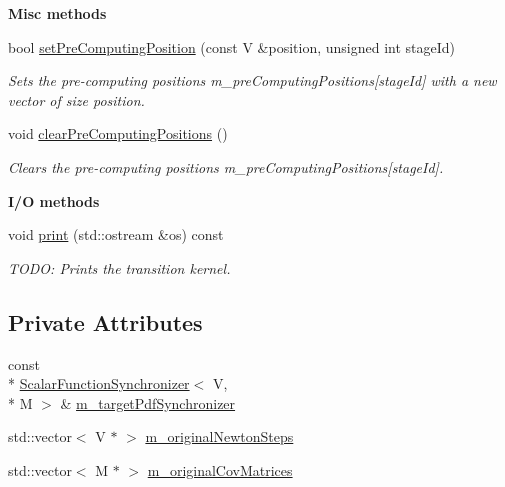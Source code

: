 \begin{Indent}{\bf Misc methods}\par
\begin{DoxyCompactItemize}
\item 
bool \hyperlink{class_q_u_e_s_o_1_1_hessian_cov_matrices_t_k_group_a935cca86e22544d5a478e05862a4a200}{set\-Pre\-Computing\-Position} (const V \&position, unsigned int stage\-Id)
\begin{DoxyCompactList}\small\item\em Sets the pre-\/computing positions {\ttfamily m\-\_\-pre\-Computing\-Positions}\mbox{[}stage\-Id\mbox{]} with a new vector of size {\ttfamily position}. \end{DoxyCompactList}\item 
void \hyperlink{class_q_u_e_s_o_1_1_hessian_cov_matrices_t_k_group_af5ca7d6d8464e444607bb3da6cd39be8}{clear\-Pre\-Computing\-Positions} ()
\begin{DoxyCompactList}\small\item\em Clears the pre-\/computing positions {\ttfamily m\-\_\-pre\-Computing\-Positions}\mbox{[}stage\-Id\mbox{]}. \end{DoxyCompactList}\end{DoxyCompactItemize}
\end{Indent}
\begin{Indent}{\bf I/\-O methods}\par
\begin{DoxyCompactItemize}
\item 
void \hyperlink{class_q_u_e_s_o_1_1_hessian_cov_matrices_t_k_group_aa780d91ffdf133df50d5d9a3a0edaa95}{print} (std\-::ostream \&os) const 
\begin{DoxyCompactList}\small\item\em T\-O\-D\-O\-: Prints the transition kernel. \end{DoxyCompactList}\end{DoxyCompactItemize}
\end{Indent}
\subsection*{Private Attributes}
\begin{DoxyCompactItemize}
\item 
const \\*
\hyperlink{class_q_u_e_s_o_1_1_scalar_function_synchronizer}{Scalar\-Function\-Synchronizer}$<$ V, \\*
M $>$ \& \hyperlink{class_q_u_e_s_o_1_1_hessian_cov_matrices_t_k_group_a22daa22c22e5d9800c3817f6912ca122}{m\-\_\-target\-Pdf\-Synchronizer}
\item 
std\-::vector$<$ V $\ast$ $>$ \hyperlink{class_q_u_e_s_o_1_1_hessian_cov_matrices_t_k_group_a4c0fe3171a35cdd453a4e23e1438ddf9}{m\-\_\-original\-Newton\-Steps}
\item 
std\-::vector$<$ M $\ast$ $>$ \hyperlink{class_q_u_e_s_o_1_1_hessian_cov_matrices_t_k_group_acc7219917faf933e77694894856fa646}{m\-\_\-original\-Cov\-Matrices}
\end{DoxyCompactItemize}
